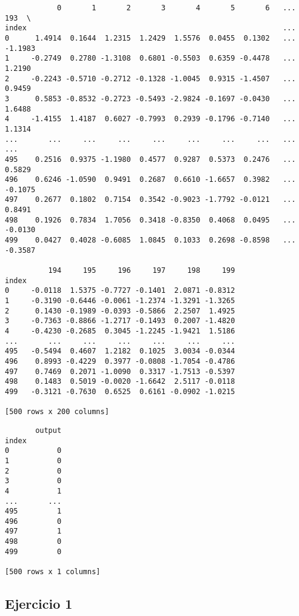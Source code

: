 \documentclass[11pt]{article}
\begin{document}
    
    \begin{verbatim}
            0       1       2       3       4       5       6   ...       193  \
index                                                           ...             
0      1.4914  0.1644  1.2315  1.2429  1.5576  0.0455  0.1302   ...   -1.1983   
1     -0.2749  0.2780 -1.3108  0.6801 -0.5503  0.6359 -0.4478   ...    1.2190   
2     -0.2243 -0.5710 -0.2712 -0.1328 -1.0045  0.9315 -1.4507   ...    0.9459   
3      0.5853 -0.8532 -0.2723 -0.5493 -2.9824 -0.1697 -0.0430   ...    1.6488   
4     -1.4155  1.4187  0.6027 -0.7993  0.2939 -0.1796 -0.7140   ...    1.1314   
...       ...     ...     ...     ...     ...     ...     ...   ...       ...   
495    0.2516  0.9375 -1.1980  0.4577  0.9287  0.5373  0.2476   ...    0.5829   
496    0.6246 -1.0590  0.9491  0.2687  0.6610 -1.6657  0.3982   ...   -0.1075   
497    0.2677  0.1802  0.7154  0.3542 -0.9023 -1.7792 -0.0121   ...    0.8491   
498    0.1926  0.7834  1.7056  0.3418 -0.8350  0.4068  0.0495   ...   -0.0130   
499    0.0427  0.4028 -0.6085  1.0845  0.1033  0.2698 -0.8598   ...   -0.3587   

          194     195     196     197     198     199  
index                                                  
0     -0.0118  1.5375 -0.7727 -0.1401  2.0871 -0.8312  
1     -0.3190 -0.6446 -0.0061 -1.2374 -1.3291 -1.3265  
2      0.1430 -0.1989 -0.0393 -0.5866  2.2507  1.4925  
3     -0.7363 -0.8866 -1.2717 -0.1493  0.2007 -1.4820  
4     -0.4230 -0.2685  0.3045 -1.2245 -1.9421  1.5186  
...       ...     ...     ...     ...     ...     ...  
495   -0.5494  0.4607  1.2182  0.1025  3.0034 -0.0344  
496    0.8993 -0.4229  0.3977 -0.0808 -1.7054 -0.4786  
497    0.7469  0.2071 -1.0090  0.3317 -1.7513 -0.5397  
498    0.1483  0.5019 -0.0020 -1.6642  2.5117 -0.0118  
499   -0.3121 -0.7630  0.6525  0.6161 -0.0902 -1.0215  

[500 rows x 200 columns]
    \end{verbatim}

    
    
    \begin{verbatim}
       output
index        
0           0
1           0
2           0
3           0
4           1
...       ...
495         1
496         0
497         1
498         0
499         0

[500 rows x 1 columns]
    \end{verbatim}

    
    \subsection{Ejercicio 1}\label{ejercicio-1}
\end{document}
